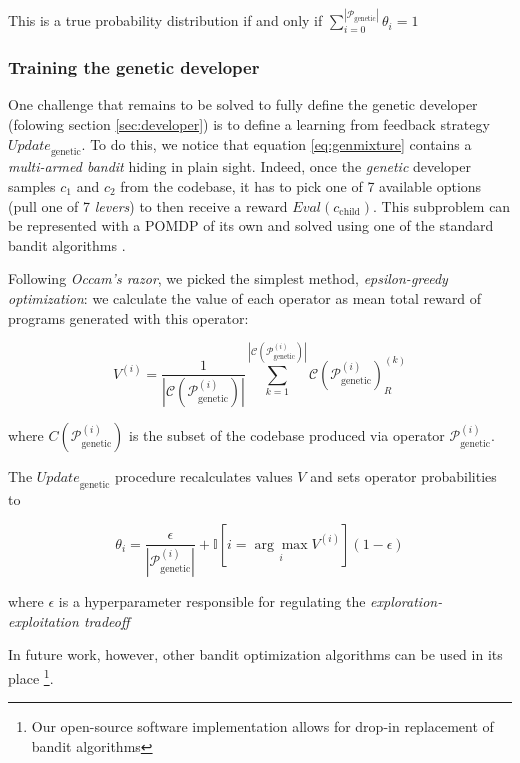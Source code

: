 This is a true probability distribution if and only if $\sum\limits_{i=0}^{|\mathcal{P}_\text{genetic}|} 
    \theta_i = 1$


\subsubsection{Training the genetic developer}

One challenge that remains to be solved to fully define the genetic developer (folowing section \ref{sec:developer}) is to define a learning from feedback strategy $\mathit{Update}_\text{genetic}$.
To do this, we notice that equation \ref{eq:genmixture} contains a \emph{multi-armed bandit} \cite{banditproblem} hiding in plain sight.
Indeed, once the \emph{genetic} developer samples $c_1$ and $c_2$ from the codebase, it has to pick one of 7 available options (pull one of 7 \emph{levers}) to then receive a reward $\mathit{Eval}(c_\text{child})$.
This subproblem can be represented with a POMDP of its own and solved using one of the standard bandit algorithms \cite{banditsolutions}.

Following \emph{Occam's razor}, we picked the simplest method, \emph{epsilon-greedy optimization}: we calculate the value of each operator as mean total reward of programs generated with this operator:

\begin{equation}
    V^{(i)} = \frac{1}{|\mathcal{C}(\mathcal{P}_\text{genetic}^{(i)})|} 
    \sum\limits_{k=1}^{|\mathcal{C}(\mathcal{P}_\text{genetic}^{(i)})|}
    \mathcal{C}(\mathcal{P}_\text{genetic}^{(i)})_R^{(k)} 
\end{equation}

where $C(\mathcal{P}_\text{genetic}^{(i)})$ is the subset of the codebase produced via operator $\mathcal{P}_\text{genetic}^{(i)}$.

The $\mathit{Update}_\text{genetic}$ procedure recalculates values $V$ and sets operator probabilities to

\begin{equation}
    \theta_i = \frac{\epsilon}{|\mathcal{P}_\text{genetic}^{(i)}|} +
    \mathbb{I}[i = \underset{i}{\arg\max} V^{(i)}] (1 - \epsilon)
\end{equation}

where $\epsilon$ is a hyperparameter responsible for regulating the \emph{exploration-exploitation tradeoff} \cite{banditsexplo}

In future work, however, other bandit optimization algorithms can be used in its place \footnote{Our open-source software implementation allows for drop-in replacement of bandit algorithms}.

